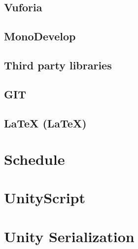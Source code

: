 \documentclass[BSP,english,oneside]{classes/gucthesis}
\begin{document}
		\subsection{Vuforia}
			\label{subsec:vuforia}
			

		\subsection{MonoDevelop}
			\label{subsec:monodevelop}
			

		\subsection{Third party libraries}
			\label{subsec:third_party_libraries}
			
			
		\subsection{GIT}
			\label{subsec:git}
			

		\subsection{LaTeX (\LaTeX{})}
			\label{subsec:latex}
			


	\section{Schedule}
		\label{sec:schedule}
		

%		

	\section{UnityScript}
		\label{sec:UnityScript}
		

	\section{Unity Serialization}
		\label{sec:UnitySerialization}
		
\end{document}
